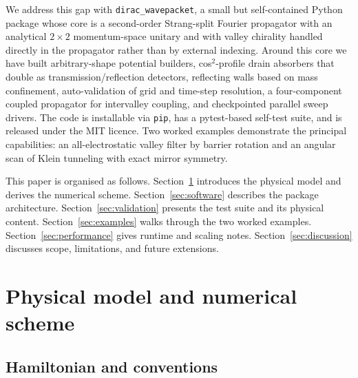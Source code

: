 \documentclass[preprint, 11pt]{elsarticle}
\newcommand{\dirac}{\texttt{dirac\_wavepacket}\xspace}
\begin{document}
We address this gap with \dirac, a small but self-contained Python
package whose core is a second-order Strang-split Fourier propagator
with an analytical $2\times2$ momentum-space unitary and with valley
chirality handled directly in the propagator rather than by external
indexing. Around this core we have built arbitrary-shape potential
builders, cos$^2$-profile drain absorbers that double as
transmission/reflection detectors, reflecting walls based on mass
confinement, auto-validation of grid and time-step resolution, a
four-component coupled propagator for intervalley coupling, and
checkpointed parallel sweep drivers. The code is installable via
\texttt{pip}, has a pytest-based self-test suite, and is released
under the MIT licence. Two worked examples demonstrate the principal
capabilities: an all-electrostatic valley filter by barrier rotation
and an angular scan of Klein tunneling with exact mirror symmetry.

This paper is organised as follows. Section~\ref{sec:method}
introduces the physical model and derives the numerical scheme.
Section~\ref{sec:software} describes the package architecture.
Section~\ref{sec:validation} presents the test suite and its physical
content. Section~\ref{sec:examples} walks through the two worked
examples. Section~\ref{sec:performance} gives runtime and scaling
notes. Section~\ref{sec:discussion} discusses scope, limitations, and
future extensions.

\section{Physical model and numerical scheme}
\label{sec:method}

\subsection{Hamiltonian and conventions}
\end{document}
